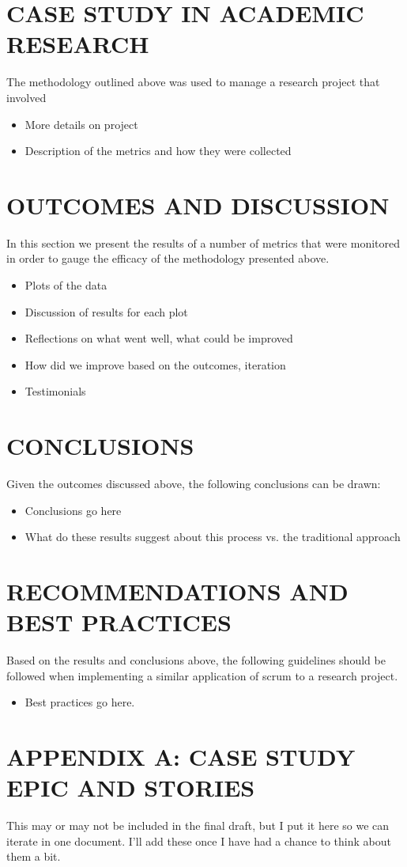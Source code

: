 \documentclass[11pt]{amsart}
\begin{document}
\section{CASE STUDY IN ACADEMIC RESEARCH}
The methodology outlined above was used to manage a research project that involved 
\begin{itemize}
\item More details on project
\item Description of the metrics and how they were collected
\end{itemize}
\section{OUTCOMES AND DISCUSSION}
In this section we present the results of a number of metrics that were monitored in order to gauge the efficacy of the methodology presented above.
\begin{itemize}
\item Plots of the data
\item Discussion of results for each plot
\item Reflections on what went well, what could be improved
\item How did we improve based on the outcomes, iteration
\item Testimonials
\end{itemize}
\section{CONCLUSIONS}
Given the outcomes discussed above, the following conclusions can be drawn:
\begin{itemize}
\item Conclusions go here
\item What do these results suggest about this process vs. the traditional approach
\end{itemize}
\section{RECOMMENDATIONS AND BEST PRACTICES}
Based on the results and conclusions above, the following guidelines should be followed when implementing a similar application of scrum to a research project.

\begin{itemize}
\item Best practices go here.
\end{itemize}

%
%

\section{APPENDIX A: CASE STUDY EPIC AND STORIES}
{\color{red}This may or may not be included in the final draft, but I put it here so we can iterate in one document. I'll add these once I have had a chance to think about them a bit.}
\end{document}
